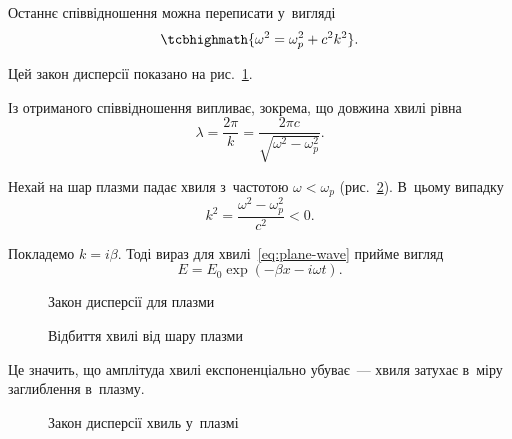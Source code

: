 Останнє співвідношення можна переписати у~вигляді
\begin{equation}\label{eq:plasma-dispersion}
	\tcbhighmath{\omega^2 = \omega_p^2 + c^2k^2}.
\end{equation}

Цей закон дисперсії показано на рис.~\ref{pic:plasma-dispersion}.

Із отриманого співвідношення випливає, зокрема, що довжина хвилі рівна
\begin{equation*}
	\lambda = \frac{2\pi}{k} = \frac{2\pi c}{\sqrt{\omega^2 - \omega_p^2}}.
\end{equation*}

Нехай на шар плазми падає хвиля з~частотою $\omega < \omega_p$ (рис.~\ref{pic:plasma-reflection}). В~цьому випадку
\begin{equation*}
	k^2 = \frac{\omega^2 - \omega_p^2}{c^2} < 0.
\end{equation*}

Покладемо $k = i\beta$. Тоді вираз для хвилі~\eqref{eq:plane-wave} прийме вигляд
\begin{equation*}
	E = E_0 \exp(-\beta x - i\omega t).
\end{equation*}

\begin{figure}[h!]\centering
	\caption{Закон дисперсії для плазми}
	\label{pic:plasma-dispersion}
\end{figure}

\begin{figure}[h!]\centering
	\caption{Відбиття хвилі від шару плазми}
	\label{pic:plasma-reflection}
\end{figure}

Це значить, що амплітуда хвилі експоненціально убуває~--- хвиля затухає в~міру заглиблення в~плазму.

\begin{figure}[h!]\centering
	\caption{Закон дисперсії хвиль у~плазмі}
	\label{pic:dispersion-law}
\end{figure}

